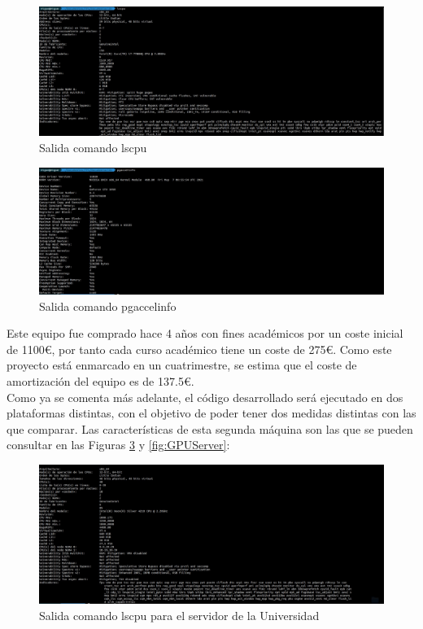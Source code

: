 \begin{figure}[H]
    \centering
    \includegraphics[width=\textwidth]{img/lscpu.jpeg}
    \caption{Salida comando lscpu}
    \label{fig:CPU}
\end{figure}

\begin{figure}[H]
    \centering
    \includegraphics[width=\textwidth]{img/pgaccelinfo.jpeg}
    \caption{Salida comando pgaccelinfo}
    \label{fig:GPU}
\end{figure}

Este equipo fue comprado hace 4 años con fines académicos por un coste inicial de 1100€, por tanto cada curso académico tiene un coste de 275€. Como este proyecto está enmarcado en un cuatrimestre, se estima que el coste de amortización del equipo es de 137.5€.\\

Como ya se comenta más adelante, el código desarrollado será ejecutado en dos plataformas distintas, con el objetivo de poder tener dos medidas distintas con las que comparar. Las características de esta segunda máquina son las que se pueden consultar en las Figuras \ref{fig:CPUServer} y \ref{fig:GPUServer}:

\begin{figure}[H]
    \centering
    \includegraphics[width=\textwidth]{img/lscpuServer.jpeg}
    \caption{Salida comando lscpu para el servidor de la Universidad}
    \label{fig:CPUServer}
\end{figure}

